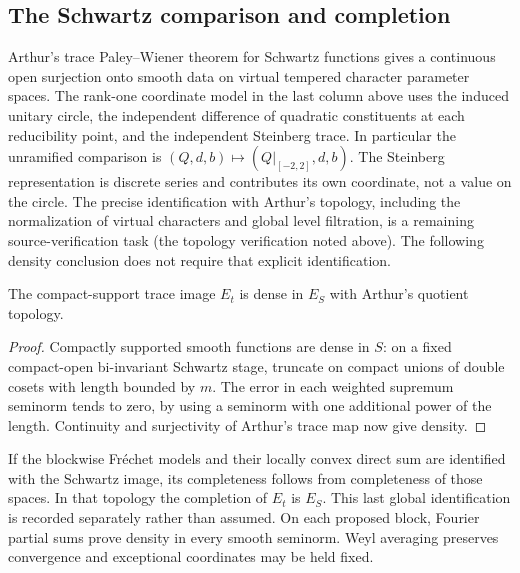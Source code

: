 \subsection{The Schwartz comparison and completion}
Arthur's trace Paley--Wiener theorem for Schwartz functions \cite[p.~174]{Ar94} gives a continuous open surjection onto smooth data on virtual tempered character parameter spaces. The rank-one coordinate model in the last column above uses the induced unitary circle, the independent difference of quadratic constituents at each reducibility point, and the independent Steinberg trace. In particular the unramified comparison is $(Q,d,b)\mapsto(Q|_{[-2,2]},d,b)$. The Steinberg representation is discrete series and contributes its own coordinate, not a value on the circle. The precise identification with Arthur's topology, including the normalization of virtual characters and global level filtration, is a remaining source-verification task (the topology verification noted above). The following density conclusion does not require that explicit identification.

\begin{theorem}\label{thm:pwcompletion}
The compact-support trace image $E_t$ is dense in $E_S$ with Arthur's quotient topology.
\end{theorem}
\begin{proof}
Compactly supported smooth functions are dense in $S$: on a fixed compact-open bi-invariant Schwartz stage, truncate on compact unions of double cosets with length bounded by $m$. The error in each weighted supremum seminorm tends to zero, by using a seminorm with one additional power of the length. Continuity and surjectivity of Arthur's trace map now give density.
\end{proof}
If the blockwise Fréchet models and their locally convex direct sum are identified with the Schwartz image, its completeness follows from completeness of those spaces. In that topology the completion of $E_t$ is $E_S$. This last global identification is recorded separately rather than assumed. On each proposed block, Fourier partial sums prove density in every smooth seminorm. Weyl averaging preserves convergence and exceptional coordinates may be held fixed.

\begin{center}
\end{center}

